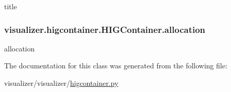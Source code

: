 title 

\subsubsection[{\texorpdfstring{allocation}{allocation}}]{\setlength{\rightskip}{0pt plus 5cm}visualizer.\+higcontainer.\+H\+I\+G\+Container.\+allocation}\hypertarget{classvisualizer_1_1higcontainer_1_1HIGContainer_af0d4a951cf5815dc69d44bea5d450c59}{}\label{classvisualizer_1_1higcontainer_1_1HIGContainer_af0d4a951cf5815dc69d44bea5d450c59}


allocation 



The documentation for this class was generated from the following file\+:\begin{DoxyCompactItemize}
\item 
visualizer/visualizer/\hyperlink{higcontainer_8py}{higcontainer.\+py}\end{DoxyCompactItemize}
